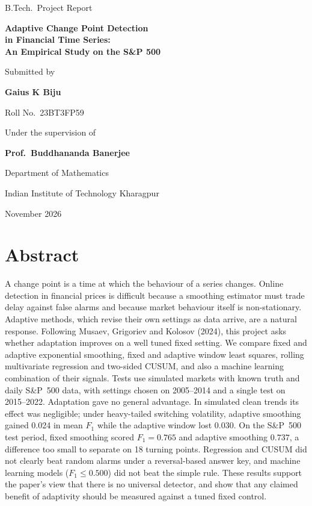 \documentclass[12pt,a4paper]{report}
\theoremstyle{definition}\newtheorem{definition}{Definition}[chapter]
\newcommand{\fillin}[1]{\colorbox{yellow!50}{#1}}
\begin{document}
\begin{titlepage}\centering
{\large B.Tech.\ Project Report\par}\vspace{1.4cm}
{\LARGE\bfseries Adaptive Change Point Detection\\[4pt] in Financial Time Series:\\[4pt] An Empirical Study on the S\&P 500\par}\vspace{1.6cm}
Submitted by\par\vspace{0.2cm}
{\large\bfseries Gaius K Biju\par}
Roll No.\ 23BT3FP59\par\vspace{1.2cm}
Under the supervision of\par\vspace{0.2cm}
{\large\bfseries Prof.\ Buddhananda Banerjee\par}\vspace{1.6cm}
Department of Mathematics\par
Indian Institute of Technology Kharagpur\par\vspace{0.3cm}
\fillin{November 2026}
\end{titlepage}
\chapter*{Abstract}
A change point is a time at which the behaviour of a series changes. Online detection in financial prices is difficult because a smoothing estimator must trade delay against false alarms and because market behaviour itself is non-stationary. Adaptive methods, which revise their own settings as data arrive, are a natural response. Following Musaev, Grigoriev and Kolosov (2024), this project asks whether adaptation improves on a well tuned fixed setting. We compare fixed and adaptive exponential smoothing, fixed and adaptive window least squares, rolling multivariate regression and two-sided CUSUM, and also a machine learning combination of their signals. Tests use simulated markets with known truth and daily S\&P~500 data, with settings chosen on 2005--2014 and a single test on 2015--2022. Adaptation gave no general advantage. In simulated clean trends its effect was negligible; under heavy-tailed switching volatility, adaptive smoothing gained 0.024 in mean $F_1$ while the adaptive window lost 0.030. On the S\&P~500 test period, fixed smoothing scored $F_1=0.765$ and adaptive smoothing $0.737$, a difference too small to separate on 18 turning points. Regression and CUSUM did not clearly beat random alarms under a reversal-based answer key, and machine learning models ($F_1\le 0.500$) did not beat the simple rule. These results support the paper's view that there is no universal detector, and show that any claimed benefit of adaptivity should be measured against a tuned fixed control.
\tableofcontents
\clearpage{}
\end{document}
